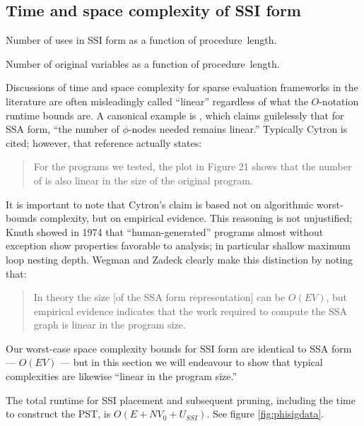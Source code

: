 \documentclass[12pt,titlepage,twoside]{article}
\begin{document}
\subsection{Time and space complexity of SSI form}\label{sec:ssi_complexity}
%
\begin{myfigure}%

\caption{Number of uses in SSI form as a function of
procedure~length.}
\label{fig:ussidata}
\end{myfigure}
\begin{myfigure}%

\caption{Number of original variables as a function of
procedure~length.}
\label{fig:v0data}
\end{myfigure}
Discussions of time and space complexity for sparse evaluation
frameworks in the literature are often misleadingly called ``linear''
regardless of what the $O$-notation runtime bounds are.  A canonical
example is \cite{sreedhar95:lintime}, which claims guilelessly that
for SSA form, ``the number of $\phi$-nodes needed remains linear.''
Typically Cytron \cite{cytron91:ssa} is cited; however, that reference
actually states:
\begin{quote}
For the programs we tested, the plot in Figure 21 shows that the
number of  is also linear in the size of the original
program.
\end{quote}
It is important to note that Cytron's claim is based not on
algorithmic worst-bounds complexity, but on empirical evidence.  This
reasoning is not unjustified; Knuth \cite{knuth74:fortran} showed in
1974 that ``human-generated'' programs almost without exception show
properties favorable to analysis; in particular shallow maximum loop
nesting depth.  Wegman and Zadeck \cite{wegman91:scc} clearly make
this distinction by noting that:
\begin{quote}
In theory the size [of the SSA form representation] can be $O(EV)$,
but empirical evidence indicates that the work required to compute the
SSA graph is linear in the program size.
\end{quote}
Our worst-case space complexity bounds for SSI form are identical to
SSA form --- $O(EV)$ --- but in this section we will endeavour to show
that typical complexities are likewise ``linear in the program size.''

The total runtime for SSI
placement and subsequent pruning, including the time to construct the
PST, is $O(E + N V_0 + U_{SSI})$.
See figure \vref{fig:phisigdata}.%
\end{document}
